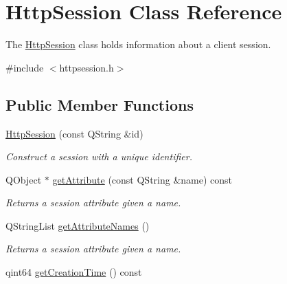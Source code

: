 \hypertarget{class_http_session}{}\section{Http\+Session Class Reference}
\label{class_http_session}


The \mbox{\hyperlink{class_http_session}{Http\+Session}} class holds information about a client session.  




{\ttfamily \#include $<$httpsession.\+h$>$}

\subsection*{Public Member Functions}
\begin{DoxyCompactItemize}
\item 
\mbox{\label{class_http_session_adbc731f974a6de5996b7878303f351af}} 
\mbox{\hyperlink{class_http_session_adbc731f974a6de5996b7878303f351af}{Http\+Session}} (const Q\+String \&id)
\begin{DoxyCompactList}\small\item\em Construct a session with a unique identifier. \end{DoxyCompactList}\item 
Q\+Object $\ast$ \mbox{\hyperlink{class_http_session_acef8380ce20f3adb9d2bb9aad0ff3f46}{get\+Attribute}} (const Q\+String \&name) const
\begin{DoxyCompactList}\small\item\em Returns a session attribute given a name. \end{DoxyCompactList}\item 
\mbox{\label{class_http_session_aca7b24bde0466a8140c30f6642c8dfc4}} 
Q\+String\+List \mbox{\hyperlink{class_http_session_aca7b24bde0466a8140c30f6642c8dfc4}{get\+Attribute\+Names}} ()
\begin{DoxyCompactList}\small\item\em Returns a session attribute given a name. \end{DoxyCompactList}\item 
\mbox{\label{class_http_session_a2904b92fb73b8cead32068611878a9eb}} 
qint64 \mbox{\hyperlink{class_http_session_a2904b92fb73b8cead32068611878a9eb}{get\+Creation\+Time}} () const

\end{DoxyCompactItemize}
